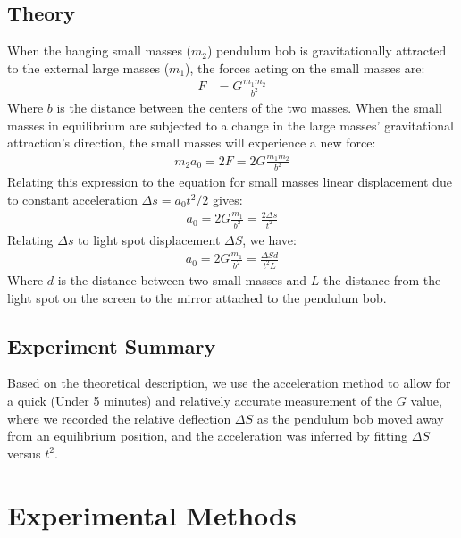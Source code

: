 \documentclass{article}
\begin{document}



\subsection{Theory}

When the hanging small masses ($m_2$) pendulum bob is gravitationally attracted to the external large masses ($m_1$), the forces acting on the small masses are:
\begin{align}
    F &= G \frac{m_1 m_2}{b^2} 
\end{align}
Where $b$ is the distance between the centers of the two masses. When the small masses in equilibrium are subjected to a change in the large masses' gravitational attraction's direction, the small masses will experience a new force:
\begin{align}
    m_2 a_0 = 2 F =  2 G \frac{m_1 m_2}{b^2}
\end{align}
Relating this expression to the equation for small masses linear displacement due to constant acceleration $\Delta s = a_0 t^2 / 2$ gives: 
\begin{align}
    a_0 = 2G\frac{m_1}{b^2} = \frac{2\Delta s}{t^2}
\end{align}
Relating $\Delta s$ to light spot displacement $\Delta S$, we have:
\begin{align}
    a_0 = 2G\frac{m_1}{b^2} = \frac{\Delta S d}{t^2 L}
\end{align}
Where $d$ is the distance between two small masses and $L$ the distance from the light spot on the screen to the mirror attached to the pendulum bob. 

\subsection{Experiment Summary}
Based on the theoretical description, we use the acceleration method to allow for a quick (Under 5 minutes) and relatively accurate measurement of the $G$ value, where we recorded the relative deflection $\Delta S$ as the pendulum bob moved away from an equilibrium position, and the acceleration was inferred by fitting $\Delta S$ versus $t^2$. 

\section{Experimental Methods}
\end{document}
